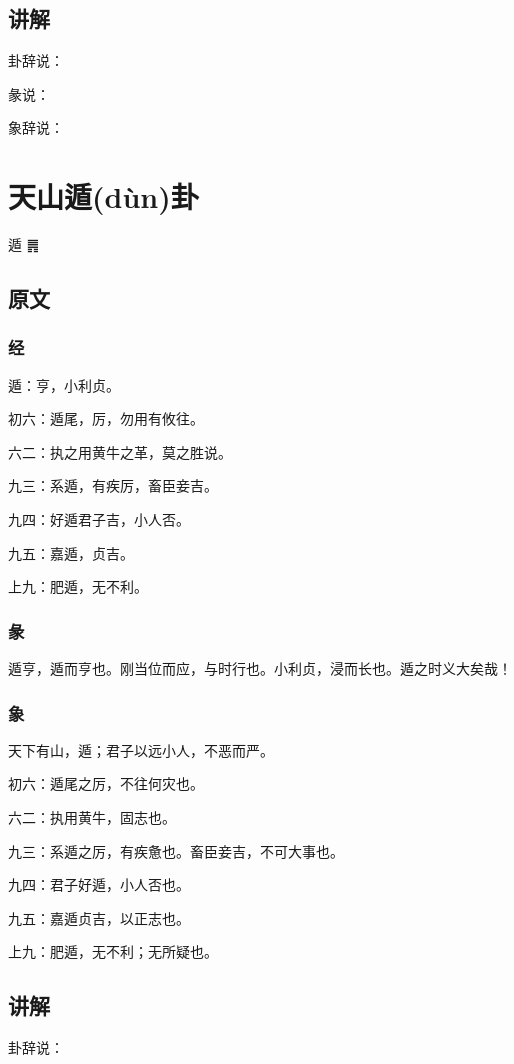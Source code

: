 \documentclass[12pt,oneside]{book}
\begin{document}
\section{讲解}
卦辞说：

彖说：

象辞说：

\chapter{天山遁(dùn)卦}
遁 {\Large ䷠}

\section{原文}

\subsection{经}
遁：亨，小利贞。

初六：遁尾，厉，勿用有攸往。

六二：执之用黄牛之革，莫之胜说。

九三：系遁，有疾厉，畜臣妾吉。

九四：好遁君子吉，小人否。

九五：嘉遁，贞吉。

上九：肥遁，无不利。

\subsection{彖}
遁亨，遁而亨也。刚当位而应，与时行也。小利贞，浸而长也。遁之时义大矣哉！

\subsection{象}
天下有山，遁；君子以远小人，不恶而严。

初六：遁尾之厉，不往何灾也。

六二：执用黄牛，固志也。

九三：系遁之厉，有疾惫也。畜臣妾吉，不可大事也。

九四：君子好遁，小人否也。

九五：嘉遁贞吉，以正志也。

上九：肥遁，无不利；无所疑也。

\section{讲解}
卦辞说：
\end{document}
